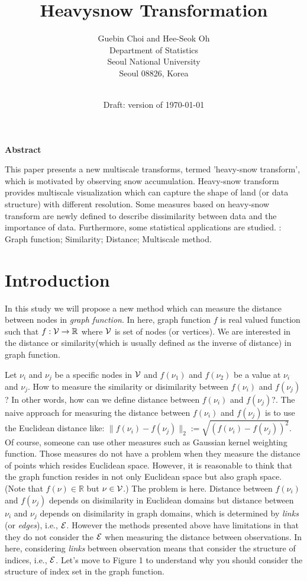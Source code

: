 \documentclass[preprint, review, 12pt]{article}
\title{\bf Heavysnow Transformation}
\author{
\sc  Guebin Choi and Hee-Seok Oh\\ 
Department of Statistics\\
Seoul National University\\
Seoul 08826, Korea \\
\\
}
\date{Draft: version of \today}
\theoremstyle{definition}
\theoremstyle{remark}
\begin{document}
\maketitle

\newpage
\thispagestyle{empty}

\begin{center}
{\bf Abstract}
\end{center}
\noindent 
This paper presents a new multiscale transforms, termed 'heavy-snow transform', which is motivated by observing snow accumulation. Heavy-snow transform provides multiscale visualization which can capture the shape of land (or data structure) with different resolution. Some measures based on heavy-snow transform are newly defined to describe dissimilarity between data and the importance of data. Furthermore, some statistical applications are studied. 
\vskip 5mm
: Graph function; Similarity; Distance; Multiscale method. 
\newpage


\section{Introduction}
In this study we will propose a new method which can measure the distance between nodes in \emph{graph function}. In here, graph function $f$ is real valued function such that $f:{\cal V} \to \mathbb{R}$ where ${\cal V}$ is set of nodes (or vertices). We are interested in the distance or similarity(which is usually defined as the inverse of distance) in graph function. 

Let $\nu_i$ and $\nu_j$ be a specific nodes in ${\cal V}$ and $f(\nu_1)$ and $f(\nu_2)$ be a value at $\nu_i$ and $\nu_j$. How to measure the similarity or disimilarity between $f(\nu_i)$ and $f(\nu_j)$? In other words, how can we define distance between $f(\nu_i)$ and $f(\nu_j)$?. The naive approach for measuring the distance between $f(\nu_i)$ and $f(\nu_j)$ is to use the Euclidean distance like: 
$
\|f(\nu_i)-f(\nu_j)\|_2:=\sqrt{(f(\nu_i)-f(\nu_j))^2}.
$ Of course, someone can use other measures such as Gaussian kernel weighting function. Those measures do not have a problem when they measure the distance of points which resides Euclidean space. However, it is reasonable to think that the graph function resides in not only Euclidean space but also graph space. (Note that $f(\nu)\in \mathbb{R}$ but $\nu \in {\cal V}$.) The problem is here. Distance between $f(\nu_i)$ and $f(\nu_j)$ depends on disimilarity in Euclidean domains but distance between $\nu_i$ and $\nu_j$ depends on disimilarity in graph domains, which is determined by \emph{links} (or \emph{edges}), i.e., ${\cal E}$. However the methods presented above have limitations in that they do not consider the ${\cal E}$ when measuring the distance between observations. In here, considering \emph{links} between observation means that consider the structure of indices, i.e., ${\cal E}$. Let's move to Figure 1 to understand why you should consider the structure of index set in the graph function. 
\end{document}
